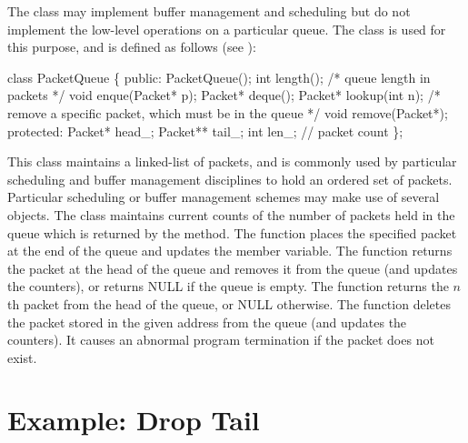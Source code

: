 The  class may implement buffer management and scheduling but
do not implement the low-level operations on a particular queue.
The  class is used for this purpose, and is defined as follows
(see ):
\begin{program}
        class PacketQueue \{
        public:
                PacketQueue();
                int length(); /* queue length in packets */
                void enque(Packet* p);
                Packet* deque();
                Packet* lookup(int n);
                /* remove a specific packet, which must be in the queue */
                void remove(Packet*);
        protected:
                Packet* head_;
                Packet** tail_;
                int len_;               // packet count
        \};
\end{program}
This class maintains a linked-list of packets, and is commonly
used by particular scheduling and buffer management disciplines
to hold an ordered set of packets.
Particular scheduling or buffer management schemes may make
use of several  objects.
The  class maintains current counts of the number of
packets held in the queue which is returned by the  method.
The  function places the specified packet at the end of
the queue and updates the  member variable.
The  function returns the packet at the head of the
queue and removes it from the queue (and updates the counters), or
returns NULL if the queue is empty.
The  function returns the $n$th packet from the head
of the queue, or NULL otherwise.
The  function deletes the packet stored in the given address
from the queue (and updates the counters).
It causes an abnormal program termination if the packet does not exist.

\section{Example: Drop Tail}
\label{sec:droptail}

